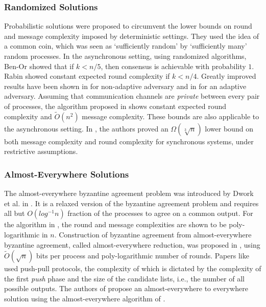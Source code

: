 \subsubsection{Randomized Solutions}
Probabilistic solutions were proposed to circumvent the lower bounds on round and message complexity imposed by deterministic settings. They used the idea of a common coin, which was seen as `sufficiently random' by `sufficiently many' random processes. 
In the asynchronous setting, using randomized algorithms, Ben-Or \cite{Ben-Or83} showed that if $k < n/5$, then consensus is achievable with probability $1$. Rabin \cite{Rabin83} showed constant expected round complexity if $k < n/4$. Greatly improved results have been shown in \cite{PCR14, KKKSS08, MHR14} for non-adaptive adversary and in \cite{KS13,AAKS14} for an adaptive adversary. Assuming that communication channels are \textit{private} between every pair of processes, the algorithm proposed in \cite{PR10} shows constant expected round complexity and $\tilde{O}(n^2)$ message complexity. These bounds are also applicable to the asynchronous setting. In \cite{HKK08}, the authors proved an $\Omega(\sqrt[3]{n})$ lower bound on both message complexity and round complexity for synchronous systems, under restrictive assumptions.

\subsubsection{Almost-Everywhere Solutions}
The almost-everywhere byzantine agreement problem was introduced by Dwork et al. in \cite{DPPU88}. It is a relaxed version of the byzantine agreement problem and requires all but $O(log^{-1}n)$ fraction of the processes to agree on a common output. For the algorithm in \cite{KSSV06}, the round and message complexities are shown to be poly-logarithmic in $n$. Construction of byzantine agreement from almost-everywhere byzantine agreement, called almost-everywhere reduction, was proposed in \cite{KS09,KLST11}, using $\tilde{O}(\sqrt{n})$ bits per process and poly-logarithmic number of rounds. 
Papers like \cite{KLST11} used push-pull protocols, the complexity of which is dictated by the complexity of the first \textit{push} phase and the size of the candidate lists, i.e., the number of all possible outputs. The authors of \cite{BGH13} propose an almost-everywhere to everywhere solution using the almost-everywhere algorithm of \cite{KSSV06}.

